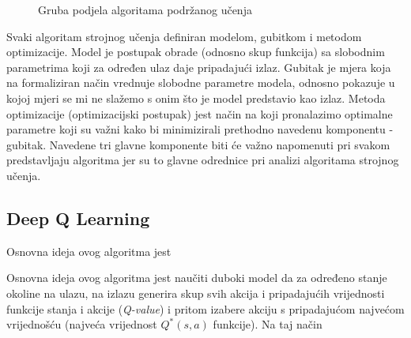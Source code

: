 \begin{figure}[H]
    \centering
    \caption{Gruba podjela algoritama podržanog učenja \cite{RLAlgos}}
    \label{fig:rl-algorithms}
\end{figure}



Svaki algoritam strojnog učenja definiran modelom, gubitkom i metodom optimizacije. Model je postupak obrade (odnosno skup funkcija) sa slobodnim parametrima koji za određen ulaz daje pripadajući izlaz. Gubitak je mjera koja na formaliziran način vrednuje slobodne parametre modela, odnosno pokazuje u kojoj mjeri se mi ne slažemo s onim što je model predstavio kao izlaz. Metoda optimizacije (optimizacijski postupak) jest način na koji pronalazimo optimalne parametre koji su važni kako bi minimizirali prethodno navedenu komponentu - gubitak. Navedene tri glavne komponente biti će važno napomenuti pri svakom predstavljaju algoritma jer su to glavne odrednice pri analizi algoritama strojnog učenja.

\subsection{Deep Q Learning}

Osnovna ideja ovog algoritma jest 

Osnovna ideja ovog algoritma jest naučiti duboki model da za određeno stanje okoline na ulazu, na izlazu generira skup svih akcija i pripadajućih vrijednosti funkcije stanja i akcije (\textit{Q-value}) i pritom izabere akciju s pripadajućom najvećom vrijednošću (najveća vrijednost $Q^*(s, a)$ funkcije). Na taj način

